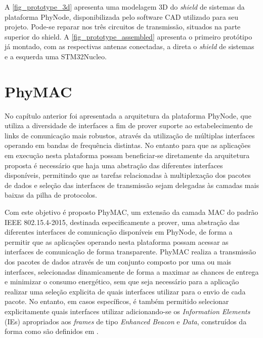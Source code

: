 \documentclass[
	12pt,				%
	openright,			%
	oneside,
	a4paper,			%
	english,			%
	french,				%
	spanish,			%
	brazil				%
	]{abntex2}
\begin{document}
A \autoref{fig_prototype_3d} apresenta uma modelagem 3D do \textit{shield} de sistemas da plataforma PhyNode, disponibilizada pelo software CAD utilizado para seu projeto. Pode-se reparar nos três circuitos de transmissão, situados na parte superior do shield. A \autoref{fig_prototype_assembled} apresenta o primeiro protótipo já montado, com as respectivas antenas conectadas, a direta o \textit{shield} de sistemas e a esquerda uma STM32Nucleo.

\chapter{PhyMAC} \label{phymac}

No capítulo anterior foi apresentada a arquitetura da plataforma PhyNode, que utiliza a diversidade de interfaces a fim de prover suporte ao estabelecimento de links de comunicação mais robustos, através da utilização de múltiplas interfaces operando em bandas de frequência distintas. No entanto para que as aplicações em execução nesta plataforma possam beneficiar-se diretamente da arquitetura proposta é necessário que haja uma abstração das diferentes interfaces disponíveis, permitindo que as tarefas relacionadas à multiplexação dos pacotes de dados e seleção das interfaces de transmissão sejam delegadas às camadas mais baixas da pilha de protocolos.

Com este objetivo é proposto PhyMAC, um extensão da camada MAC do padrão IEEE 802.15.4-2015, destinada especificamente a prover, uma abstração das diferentes interfaces de comunicação disponíveis em PhyNode, de forma a permitir que as aplicações operando nesta plataforma possam acessar as interfaces de comunicação de forma transparente. PhyMAC realiza a transmissão dos pacotes de dados através de um conjunto composto por uma ou mais interfaces, selecionadas dinamicamente de forma a maximar as chances de entrega e minimizar o consumo energético, sem que seja necessário para a aplicação realizar uma seleção explicita de quais interfaces utilizar para o envio de cada pacote. No entanto, em casos específicos, é também permitido selecionar explicitamente quais interfaces utilizar adicionando-se os \textit{Information Elements} (IEs) apropriados aos \textit{frames} de tipo \textit{Enhanced Beacon} e \textit{Data}, construídos da forma como são definidos em \cite[7. MAC frame formats]{IEEE802_15_4_2015}.
\end{document}
